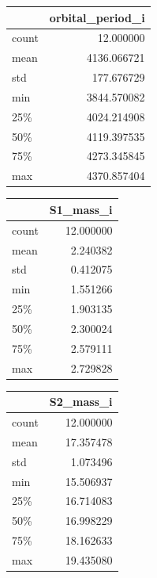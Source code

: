 \documentclass{article}
\theoremstyle{mytheoremstyle}
\theoremstyle{mytheoremstyle}
\theoremstyle{myproblemstyle}
\theoremstyle{myproblemstyle}
\begin{document}
\begin{table}[H]
\centering
  \begin{minipage}[t]{0.3\textwidth}
    \centering
    \begin{tabular}{|l|r|}
    \hline
    & orbital\_period\_i \\
    \hline
      count & 12.000000 \\
      mean & 4136.066721 \\
      std & 177.676729 \\
      min & 3844.570082 \\
      25\% & 4024.214908 \\
      50\% & 4119.397535 \\
      75\% & 4273.345845 \\
      max & 4370.857404 \\
    \hline
    \end{tabular}
  \end{minipage}
  \hfill
  \begin{minipage}[t]{0.3\textwidth}
    \centering
    \begin{tabular}{|l|r|}
    \hline
    & S1\_mass\_i \\
    \hline
      count & 12.000000 \\
      mean & 2.240382 \\
      std & 0.412075 \\
      min & 1.551266 \\
      25\% & 1.903135 \\
      50\% & 2.300024 \\
      75\% & 2.579111 \\
      max & 2.729828 \\
    \hline
    \end{tabular}
  \end{minipage}
  \hfill
  \begin{minipage}[t]{0.3\textwidth}
    \centering
    \begin{tabular}{|l|r|}
    \hline
    & S2\_mass\_i \\
    \hline
      count & 12.000000 \\
      mean & 17.357478 \\
      std & 1.073496 \\
      min & 15.506937 \\
      25\% & 16.714083 \\
      50\% & 16.998229 \\
      75\% & 18.162633 \\
      max & 19.435080 \\
    \hline
    \end{tabular}
  \end{minipage}

\end{table}
\end{document}
